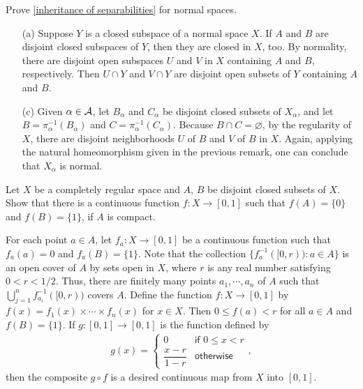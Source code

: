 \begin{prob}\label{inheritance: normal}
    Prove \cref{inheritance of separabilities} for normal spaces.
\end{prob}
\begin{sol}
    \begin{enumerate}
        \item[(a)]
        {    
            Suppose $Y$ is a closed subspace of a normal space $X$.
            If $A$ and $B$ are disjoint closed subspaces of $Y$, then they are closed in $X$, too.
            By normality, there are disjoint open subspaces $U$ and $V$ in $X$ containing $A$ and $B$, respectively.
            Then $U\cap Y$ and $V\cap Y$ are disjoint open subsets of $Y$ containing $A$ and $B$.
        }
        \item[(c)]
        {
            Given $\alpha\in{\mathcal{A}}$, let $B_\alpha$ and $C_\alpha$ be disjoint closed subsets of $X_\alpha$, and let $B=\pi_\alpha^{-1}(B_\alpha)$ and $C=\pi_\alpha^{-1}(C_\alpha)$.
            Because $B\cap C=\varnothing$, by the regularity of $X$, there are disjoint neighborhoods $U$ of $B$ and $V$ of $B$ in $X$.
            Again, applying the natural homeomorphism given in the previous remark, one can conclude that $X_\alpha$ is normal.
        }
    \end{enumerate}
\end{sol}

\begin{prob}
    Let $X$ be a completely regular space and $A,\,B$ be disjoint closed subsets of $X$.
    Show that there is a continuous function $f: X\rightarrow[0, 1]$ such that $f(A)=\{0\}$ and $f(B)=\{1\}$, if $A$ is compact.
\end{prob}
\begin{sol}
    For each point $a\in A$, let $f_a: X\rightarrow[0, 1]$ be a continuous function such that $f_a(a)=0$ and $f_a(B)=\{1\}$.
    Note that the collection $\{f_a^{-1}([0, r)):a\in A\}$ is an open cover of $A$ by sets open in $X$, where $r$ is any real number satisfying $0<r<1/2$.
    Thus, there are finitely many points $a_1, \cdots, a_n$ of $A$ such that $\bigcup_{j=1}^n f_{a_i}^{-1}([0, r))$ covers $A$.
    Define the function $f: X\rightarrow[0, 1]$ by $f(x)=f_1(x)\times\cdots\times f_n(x)$ for $x\in X$.
    Then $0\leq f(a)<r$ for all $a\in A$ and $f(B)=\{1\}$.
    If $g:[0, 1]\rightarrow[0, 1]$ is the function defined by
    \begin{eqnarray*}
        g(x)=\left\{
        \begin{matrix}
            0 & \textsf{if }0\leq x<r\\
            \dfrac{x-r}{1-r} & \textsf{otherwise}
        \end{matrix}\right.,
    \end{eqnarray*}
    then the composite $g\circ f$ is a desired continuous map from $X$ into $[0, 1]$.
\end{sol}

